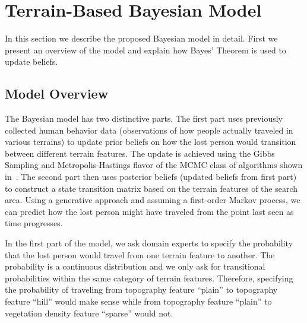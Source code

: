 \section{Terrain-Based Bayesian Model}
\label{sec:3}

In this section we describe the proposed Bayesian model in detail. First we present an overview of the model and explain how Bayes' Theorem is used to update beliefs.

\subsection{Model Overview}
\label{sec:3.1}

The Bayesian model has two distinctive parts. The first part uses previously collected human behavior data (observations of how people actually traveled in various terrains) to update prior beliefs on how the lost person would transition between different terrain features. The update is achieved using the Gibbs Sampling and Metropolis-Hastings flavor of the MCMC class of algorithms shown in~\cite{Gelman2004Bayesian}. The second part then uses posterior beliefs (updated beliefs from first part) to construct a state transition matrix based on the terrain features of the search area. Using a generative approach and assuming a first-order Markov process, we can predict how the lost person might have traveled from the point last seen as time progresses.

In the first part of the model, we ask domain experts to specify the probability that the lost person would travel from one terrain feature to another. The probability is a continuous distribution and we only ask for transitional probabilities within the same category of terrain features. Therefore, specifying the probability of traveling from topography feature ``plain'' to topography feature ``hill'' would make sense while from topography feature ``plain'' to vegetation density feature ``sparse'' would not.

